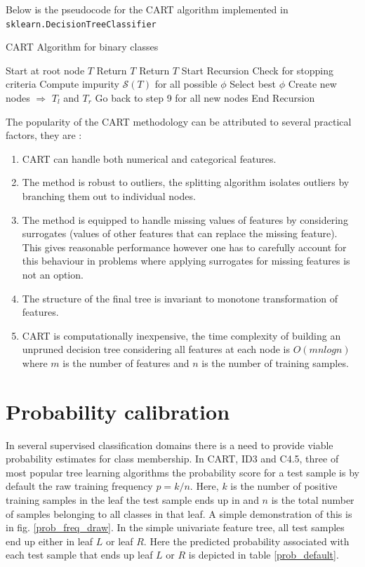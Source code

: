 \documentclass[final,3p,times,twocolumn]{elsarticle}
\begin{document}
Below is the pseudocode for the CART algorithm implemented in \texttt{sklearn.DecisionTreeClassifier}

\begin{algorithm}
\caption{CART Algorithm for binary classes}
\begin{algorithmic}[1]
\STATE Start at root node $T$
\STATE Return $T$
\STATE Return $T$
\ELSE 
\STATE Start Recursion 
\STATE Check for stopping criteria
\STATE Compute impurity $\mathcal{S}(T)$ for all possible $\phi$
\STATE Select best $\phi$
\STATE Create new nodes $\Rightarrow$ $T_{l}$ and $T_{r}$
\STATE Go back to step 9 for all new nodes
\ENDWHILE
\STATE End Recursion
\ENDIF 
\end{algorithmic}
\end{algorithm}

The popularity of the CART methodology can be attributed to several practical factors, they are :

\begin{enumerate}[label=(\roman*)]
\item{CART can handle both numerical and categorical features.}
\item{The method is robust to outliers, the splitting algorithm isolates outliers by branching them out to individual nodes.}
\item{The method is equipped to handle missing values of features by considering surrogates (values of other features that can replace the missing feature). This gives reasonable performance however one has to carefully account for this behaviour in problems where applying surrogates for missing features is not an option.}
\item{The structure of the final tree is invariant to monotone transformation  of features.}
\item{CART is computationally inexpensive, the time complexity of building an unpruned decision tree considering all features at each node is $O(mnlogn)$ where $m$ is the number of features and $n$ is the number of training samples.}
\end{enumerate}

\section{Probability calibration}
\label{prob_calib}
In several supervised classification domains there is a need to provide viable probability estimates for class membership. In CART, ID3 and C4.5, three of most popular tree learning algorithms the probability score for a test sample  is by default the raw training frequency $p = k/n$. Here, $k$ is the number of positive training samples in the leaf the test sample ends up in and $n$ is the total number of samples belonging to all classes in that leaf. A simple demonstration of this is in fig. \ref{prob_freq_draw}. 
In the simple univariate feature tree, all test samples end up either in leaf $L$ or leaf $R$. Here the predicted probability associated with each test sample that ends up leaf $L$ or $R$ is depicted in table \ref{prob_default}. 
\end{document}
